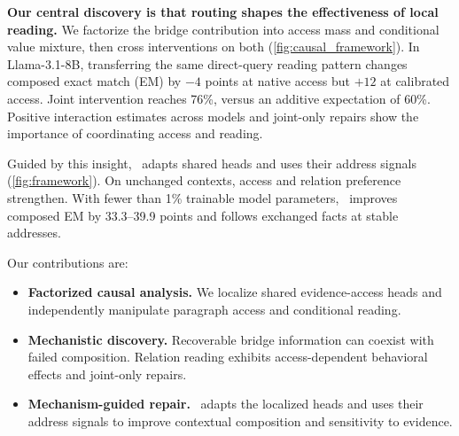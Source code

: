 \textbf{Our central discovery is that routing shapes the effectiveness of local reading.} We factorize the bridge contribution into access mass and conditional value mixture, then cross interventions on both (\cref{fig:causal_framework}). In Llama-3.1-8B, transferring the same direct-query reading pattern changes composed exact match (EM) by $-4$ points at native access but $+12$ at calibrated access. Joint intervention reaches 76\%, versus an additive expectation of 60\%. Positive interaction estimates across models and joint-only repairs show the importance of coordinating access and reading.

Guided by this insight, \method\ adapts shared heads and uses their address signals (\cref{fig:framework}). On unchanged contexts, access and relation preference strengthen. With fewer than 1\% trainable model parameters, \method\ improves composed EM by 33.3--39.9 points and follows exchanged facts at stable addresses.

Our contributions are:
\begin{itemize}[leftmargin=*,itemsep=2pt,topsep=3pt,parsep=0pt]
\item \textbf{Factorized causal analysis.} We localize shared evidence-access heads and independently manipulate paragraph access and conditional reading.
\item \textbf{Mechanistic discovery.} Recoverable bridge information can coexist with failed composition. Relation reading exhibits access-dependent behavioral effects and joint-only repairs.
\item \textbf{Mechanism-guided repair.} \method\ adapts the localized heads and uses their address signals to improve contextual composition and sensitivity to evidence.
\end{itemize}
